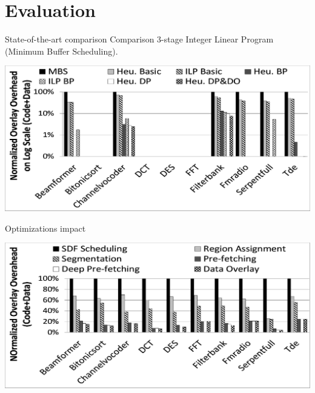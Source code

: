 \documentclass{beamer}
\begin{document}
\section{Evaluation}

\begin{frame}{State-of-the-art comparison}
  Comparison 3-stage Integer Linear Program (Minimum Buffer Scheduling).
  \begin{center}
    \hspace*{-0.05\textwidth}
    \includegraphics[width=1.1\textwidth]{fig10}
  \end{center}
\end{frame}

\begin{frame}{Optimizations impact}
  \begin{center}
    \hspace*{-0.05\textwidth}
    \includegraphics[width=1.1\textwidth]{fig11}
  \end{center}
\end{frame}
\end{document}
